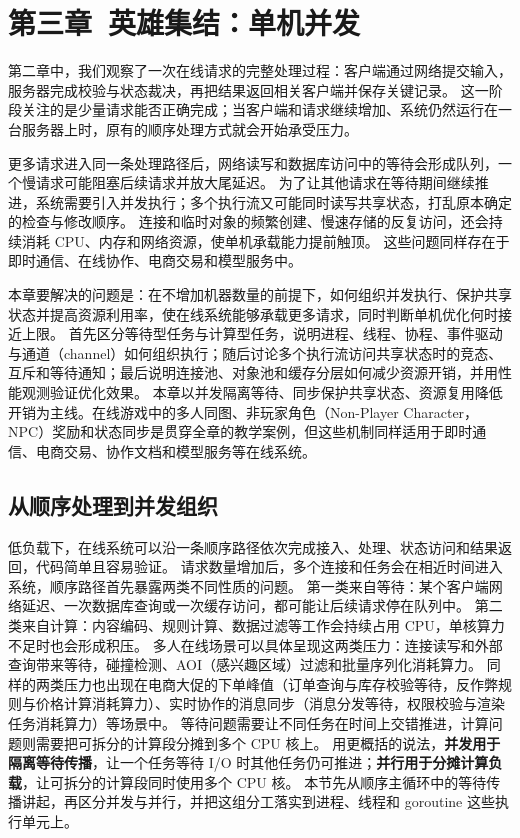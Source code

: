 \section{第三章\ 英雄集结：单机并发}\label{sec:chapter3}

第二章中，我们观察了一次在线请求的完整处理过程：客户端通过网络提交输入，服务器完成校验与状态裁决，再把结果返回相关客户端并保存关键记录。
这一阶段关注的是少量请求能否正确完成；当客户端和请求继续增加、系统仍然运行在一台服务器上时，原有的顺序处理方式就会开始承受压力。

更多请求进入同一条处理路径后，网络读写和数据库访问中的等待会形成队列，一个慢请求可能阻塞后续请求并放大尾延迟。
为了让其他请求在等待期间继续推进，系统需要引入并发执行；多个执行流又可能同时读写共享状态，打乱原本确定的检查与修改顺序。
连接和临时对象的频繁创建、慢速存储的反复访问，还会持续消耗 CPU、内存和网络资源，使单机承载能力提前触顶。
这些问题同样存在于即时通信、在线协作、电商交易和模型服务中。

本章要解决的问题是：在不增加机器数量的前提下，如何组织并发执行、保护共享状态并提高资源利用率，使在线系统能够承载更多请求，同时判断单机优化何时接近上限。
首先区分等待型任务与计算型任务，说明进程、线程、协程、事件驱动与通道（channel）如何组织执行；随后讨论多个执行流访问共享状态时的竞态、互斥和等待通知；最后说明连接池、对象池和缓存分层如何减少资源开销，并用性能观测验证优化效果。
本章以并发隔离等待、同步保护共享状态、资源复用降低开销为主线。在线游戏中的多人同图、非玩家角色（Non-Player Character，NPC）奖励和状态同步是贯穿全章的教学案例，但这些机制同样适用于即时通信、电商交易、协作文档和模型服务等在线系统。

\subsection{从顺序处理到并发组织}\label{sec3:concurrency-coordinate}

低负载下，在线系统可以沿一条顺序路径依次完成接入、处理、状态访问和结果返回，代码简单且容易验证。
请求数量增加后，多个连接和任务会在相近时间进入系统，顺序路径首先暴露两类不同性质的问题。
第一类来自等待：某个客户端网络延迟、一次数据库查询或一次缓存访问，都可能让后续请求停在队列中。
第二类来自计算：内容编码、规则计算、数据过滤等工作会持续占用 CPU，单核算力不足时也会形成积压。
多人在线场景可以具体呈现这两类压力：连接读写和外部查询带来等待，碰撞检测、AOI（感兴趣区域）过滤和批量序列化消耗算力。
同样的两类压力也出现在电商大促的下单峰值（订单查询与库存校验等待，反作弊规则与价格计算消耗算力）、实时协作的消息同步（消息分发等待，权限校验与渲染任务消耗算力）等场景中。
等待问题需要让不同任务在时间上交错推进，计算问题则需要把可拆分的计算段分摊到多个 CPU 核上。
用更概括的说法，\textbf{并发用于隔离等待传播}，让一个任务等待 I/O 时其他任务仍可推进；\textbf{并行用于分摊计算负载}，让可拆分的计算段同时使用多个 CPU 核。
本节先从顺序主循环中的等待传播讲起，再区分并发与并行，并把这组分工落实到进程、线程和 goroutine 这些执行单元上。

